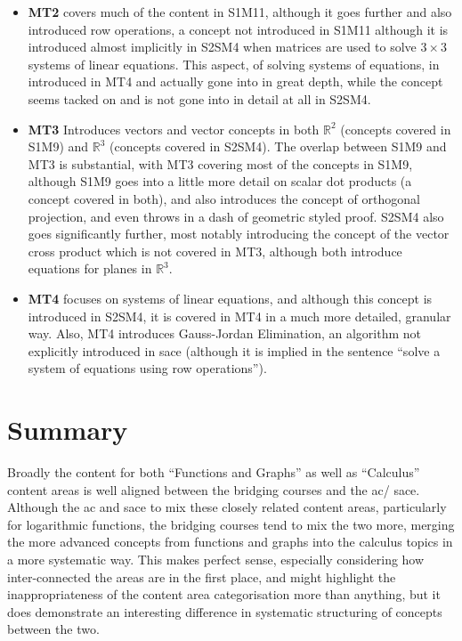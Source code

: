 \documentclass[twoside,12pt,a4paper]{report}
\begin{document}
\begin{itemize}
	\item \textbf{MT2} covers much of the content in S1M11, although it goes further and also introduced row operations, a concept not introduced in S1M11 although it is introduced almost implicitly in S2SM4 when matrices are used to solve $3 \times 3$ systems of linear equations. This aspect, of solving systems of equations, in introduced in MT4 and actually gone into in great depth, while the concept seems tacked on and is not gone into in detail at all in S2SM4.
	\item \textbf{MT3} Introduces vectors and vector concepts in both $\mathbb{R}^2$ (concepts covered in S1M9) and $\mathbb{R}^3$ (concepts covered in S2SM4). The overlap between S1M9 and MT3 is substantial, with MT3 covering most of the concepts in S1M9, although S1M9 goes into a little more detail on scalar dot products (a concept covered in both), and also introduces the concept of orthogonal projection, and even throws in a dash of geometric styled proof. S2SM4 also goes significantly further, most notably introducing the concept of the vector cross product which is not covered in MT3, although both introduce equations for planes in $\mathbb{R}^3$.
	\item \textbf{MT4} focuses on systems of linear equations, and although this concept is introduced in S2SM4, it is covered in MT4 in a much more detailed, granular way. Also, MT4 introduces Gauss-Jordan Elimination, an algorithm not explicitly introduced in \gls{sace} (although it is implied in the sentence ``solve a system of equations using row operations'').
\end{itemize}







\section{Summary}
\label{sec:curriculumRecommendations}

Broadly the content for both ``Functions and Graphs'' as well as ``Calculus'' content areas is well aligned between the bridging courses and the \gls{ac}/ \gls{sace}. Although the \gls{ac} and \gls{sace} to mix these closely related content areas, particularly for logarithmic functions, the bridging courses tend to mix the two more, merging the more advanced concepts from functions and graphs into the calculus topics in a more systematic way. This makes perfect sense, especially considering how inter-connected the areas are in the first place, and might highlight the inappropriateness of the content area categorisation more than anything, but it does demonstrate an interesting difference in systematic structuring of concepts between the two. 
\end{document}
